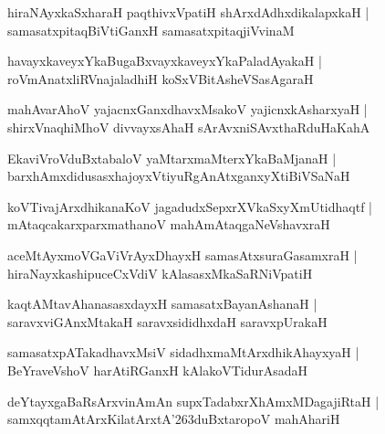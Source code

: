 \documentclass[twoside,12pt,openright]{book}
\def\S{\char'263}
\newcounter{shloka}[chapter]
\begin{document}
\begin{shloka}%
hiraNAyxkaSxharaH paqthivxVpatiH shArxdAdhxdikalapxkaH |\\
samasatxpitaqBiVtiGanxH samasatxpitaqjiVvinaM 
\end{shloka}

\begin{shloka}%
havayxkaveyxYkaBugaBxvayxkaveyxYkaPaladAyakaH |\\
roVmAnatxliRVnajaladhiH koSxVBitAsheVSasAgaraH 
\end{shloka}

\begin{shloka}%
mahAvarAhoV yajacnxGanxdhavxMsakoV yajicnxkAsharxyaH |\\
shirxVnaqhiMhoV divvayxsAhaH sArAvxniSAvxthaRduHaKahA 
\end{shloka}

\begin{shloka}%
EkaviVroVduBxtabaloV yaMtarxmaMterxYkaBaMjanaH |\\
barxhAmxdidusasxhajoyxVtiyuRgAnAtxganxyXtiBiVSaNaH
\end{shloka}

\begin{shloka}%
koVTivajArxdhikanaKoV jagadudxSepxrXVkaSxyXmUtidhaqtf |\\
mAtaqcakarxparxmathanoV mahAmAtaqgaNeVshavxraH 
\end{shloka}

\begin{shloka}%
aceMtAyxmoVGaViVrAyxDhayxH samasAtxsuraGasamxraH |\\
hiraNayxkashipuceCxVdiV kAlasasxMkaSaRNiVpatiH 
\end{shloka}

\begin{shloka}%
kaqtAMtavAhanasasxdayxH samasatxBayanAshanaH |\\
saravxviGAnxMtakaH saravxsididhxdaH saravxpUrakaH 
\end{shloka}

\begin{shloka}%
samasatxpATakadhavxMsiV sidadhxmaMtArxdhikAhayxyaH |\\
BeYraveVshoV harAtiRGanxH kAlakoVTidurAsadaH 
\end{shloka}

\begin{shloka}%
deYtayxgaBaRsArxvinAmAn supxTadabxrXhAmxMDagajiRtaH |\\
samxqqtamAtArxKilatArxtA\S duBxtaropoV mahAhariH
\end{shloka}
\end{document}
